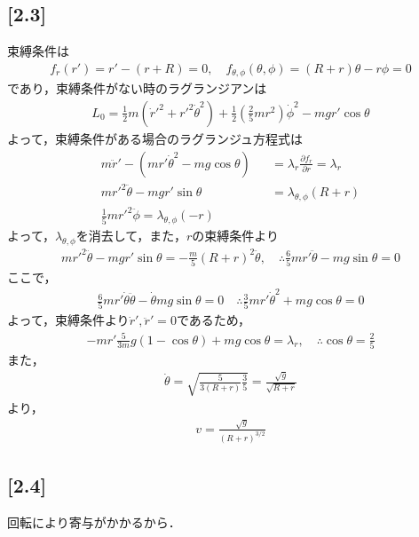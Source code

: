 \documentclass[12pt,dvipdfmx]{jsarticle}
\begin{document}
\subsection*{\large{[2.3]}}
束縛条件は
\begin{eqnarray}
  f_r(r') = r' - (r+R) = 0, \quad f_{\theta,\phi}(\theta,\phi) = (R+r)\theta -r\phi =0
\end{eqnarray}
であり，束縛条件がない時のラグランジアンは
\begin{eqnarray}
  L_0 = \frac{1}{2}m (\dot{r}'^2 + r'^2 \dot{\theta}^2) + \frac{1}{2}\left( \frac{2}{5}mr^2 \right)\dot{\phi}^2 - mgr' \cos\theta
\end{eqnarray}
よって，束縛条件がある場合のラグランジュ方程式は
\begin{eqnarray}
  m\ddot{r}' - ( mr'\dot{\theta}^2 -mg\cos\theta ) &&= \lambda_r \frac{\partial f_r}{\partial r} = \lambda_r\\
  mr'^2\ddot{\theta}-mgr'\sin\theta &&= \lambda_{\theta,\phi}(R+r)\\
  \frac{1}{5}mr'^2 \ddot{\phi} = \lambda_{\theta,\phi}(-r)
\end{eqnarray}
よって，$\lambda_{\theta,\phi}$を消去して，また，$r$の束縛条件より
\begin{eqnarray}
  mr'^2\ddot{\theta}-mgr'\sin\theta = -\frac{m}{5}(R+r)^2 \ddot{\theta}, \quad\therefore \frac{6}{5}mr'\ddot{\theta}-mg\sin\theta =0
\end{eqnarray}
ここで，
\begin{eqnarray}
  \frac{6}{5}mr' \dot{\theta}\ddot{\theta} - \dot{\theta}mg\sin\theta = 0\quad\therefore \frac{3}{5}mr' \dot{\theta}^2 + mg\cos\theta =0
\end{eqnarray}
よって，束縛条件より$\dot{r}', \ddot{r}' =0$であるため，
\begin{eqnarray}
  -mr' \frac{5}{3m}g(1-\cos\theta) + mg\cos\theta = \lambda_r, \quad\therefore \cos\theta = \frac{2}{5}
\end{eqnarray}
また，
\begin{eqnarray}
  \dot{\theta} = \sqrt{ \frac{5}{3(R+r)}\frac{3}{5} } = \frac{\sqrt{g}}{\sqrt{ R+r }}
\end{eqnarray}
より，
\begin{eqnarray}
  v = \frac{\sqrt{g}}{(R+r)^{3/2}}
\end{eqnarray}
\subsection*{\large{[2.4]}}
回転により寄与がかかるから．
\end{document}
